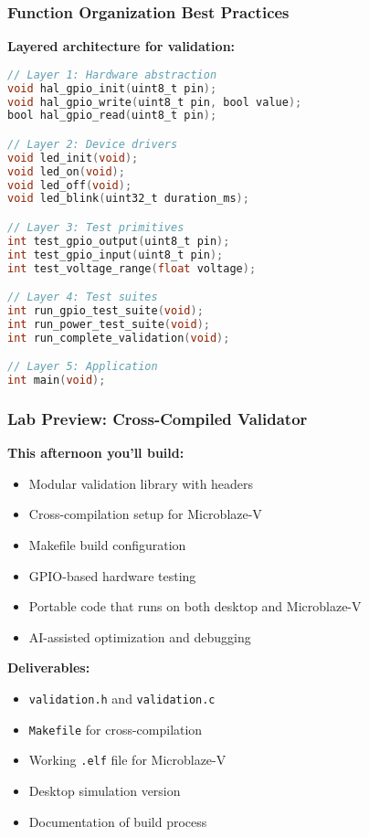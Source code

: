 \documentclass{beamer}
\begin{document}
\begin{frame}[fragile]
\frametitle{Function Organization Best Practices}
\textbf{Layered architecture for validation:}
\begin{lstlisting}[language=C]
// Layer 1: Hardware abstraction
void hal_gpio_init(uint8_t pin);
void hal_gpio_write(uint8_t pin, bool value);
bool hal_gpio_read(uint8_t pin);

// Layer 2: Device drivers
void led_init(void);
void led_on(void);
void led_off(void);
void led_blink(uint32_t duration_ms);

// Layer 3: Test primitives
int test_gpio_output(uint8_t pin);
int test_gpio_input(uint8_t pin);
int test_voltage_range(float voltage);

// Layer 4: Test suites
int run_gpio_test_suite(void);
int run_power_test_suite(void);
int run_complete_validation(void);

// Layer 5: Application
int main(void);
\end{lstlisting}
\end{frame}

\begin{frame}
\frametitle{Lab Preview: Cross-Compiled Validator}
\textbf{This afternoon you'll build:}
\begin{itemize}
    \item Modular validation library with headers
    \item Cross-compilation setup for Microblaze-V
    \item Makefile build configuration
    \item GPIO-based hardware testing
    \item Portable code that runs on both desktop and Microblaze-V
    \item AI-assisted optimization and debugging
\end{itemize}

\vspace{0.5cm}
\textbf{Deliverables:}
\begin{itemize}
    \item \texttt{validation.h} and \texttt{validation.c}
    \item \texttt{Makefile} for cross-compilation
    \item Working \texttt{.elf} file for Microblaze-V
    \item Desktop simulation version
    \item Documentation of build process
\end{itemize}
\end{frame}
\end{document}
